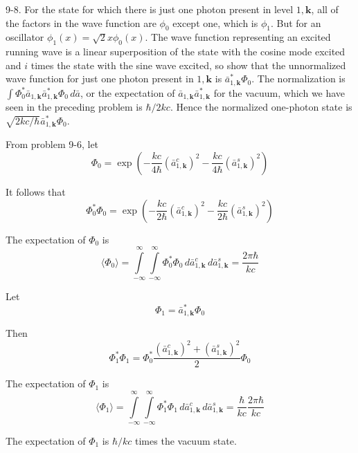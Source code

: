 \documentclass[12pt]{article}
\begin{document}
9-8.
For the state for which there is just one photon
present in level $1,\mathbf k$, all of the factors in the wave function are
$\phi_0$ except one, which is $\phi_1$.
But for an oscillator $\phi_1(x)=\sqrt2x\phi_0(x)$.
The wave function representing an excited running wave is a linear
superposition of the state with the cosine mode excited and $i$
times the state with the sine wave excited, so show that the
unnormalized wave function for just one photon present in
$1,\mathbf k$ is $\bar a_{1,\mathbf k}^*\Phi_0$.
The normalization is
$\int\Phi_0^*\bar a_{1,\mathbf k}\bar a_{1,\mathbf k}^*\Phi_0\,d\bar a$,
or the expectation of $\bar a_{1,\mathbf k}\bar a_{1,\mathbf k}^*$ for the
vacuum, which we have seen in the preceding problem is $\hbar/2kc$.
Hence the normalized one-photon state is
$\sqrt{2kc/\hbar}\bar a_{1,\mathbf k}^*\Phi_0$.

\bigskip
From problem 9-6, let
\begin{equation*}
\Phi_0=\exp\left(-\frac{kc}{4\hbar}(\bar a_{1,\mathbf k}^c)^2-\frac{kc}{4\hbar}(\bar a_{1,\mathbf k}^s)^2\right)
\end{equation*}

It follows that
\begin{equation*}
\Phi_0^*\Phi_0=\exp\left(-\frac{kc}{2\hbar}(\bar a_{1,\mathbf k}^c)^2-\frac{kc}{2\hbar}(\bar a_{1,\mathbf k}^s)^2\right)
\end{equation*}

The expectation of $\Phi_0$ is
\begin{equation*}
\langle\Phi_0\rangle=
\int\limits_{-\infty}^\infty
\int\limits_{-\infty}^\infty
\Phi_0^*\Phi_0
\,d\bar a_{1,\mathbf k}^c\,d\bar a_{1,\mathbf k}^s=\frac{2\pi\hbar}{kc}
\tag{1}
\end{equation*}

Let
\begin{equation*}
\Phi_1=\bar a_{1,\mathbf k}^*\Phi_0
\end{equation*}

Then
\begin{equation*}
\Phi_1^*\Phi_1=\Phi_0^*\frac{(\bar a_{1,\mathbf k}^c)^2+(\bar a_{1,\mathbf k}^s)^2}{2}\Phi_0
\end{equation*}

The expectation of $\Phi_1$ is
\begin{equation*}
\langle\Phi_1\rangle=
\int\limits_{-\infty}^\infty
\int\limits_{-\infty}^\infty
\Phi_1^*\Phi_1
\,d\bar a_{1,\mathbf k}^c\,d\bar a_{1,\mathbf k}^s
=\frac{\hbar}{kc}\frac{2\pi\hbar}{kc}
\tag{2}
\end{equation*}

The expectation of $\Phi_1$ is $\hbar/kc$ times the vacuum state.
\end{document}
